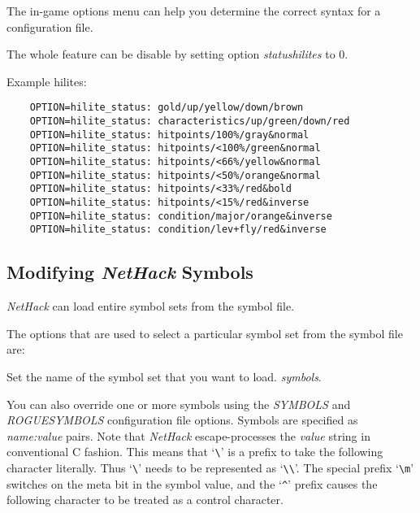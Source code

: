 The in-game options menu can help you determine the correct syntax for a
configuration file.

The whole feature can be disable by setting option {\it statushilites} to 0.

Example hilites:
\begin{verbatim}
    OPTION=hilite_status: gold/up/yellow/down/brown
    OPTION=hilite_status: characteristics/up/green/down/red
    OPTION=hilite_status: hitpoints/100%/gray&normal
    OPTION=hilite_status: hitpoints/<100%/green&normal
    OPTION=hilite_status: hitpoints/<66%/yellow&normal
    OPTION=hilite_status: hitpoints/<50%/orange&normal
    OPTION=hilite_status: hitpoints/<33%/red&bold
    OPTION=hilite_status: hitpoints/<15%/red&inverse
    OPTION=hilite_status: condition/major/orange&inverse
    OPTION=hilite_status: condition/lev+fly/red&inverse
\end{verbatim}

\subsection*{Modifying {\it NetHack\/} Symbols}

{\it NetHack\/} can load entire symbol sets from the symbol file.

The options that are used to select a particular symbol set from the
symbol file are:

\blist{}
\item[\ib{symset}]
Set the name of the symbol set that you want to load.
{\it symbols\/}.
\elist

You can also override one or more symbols using the {\it SYMBOLS\/} and
{\it ROGUESYMBOLS\/} configuration file options.
Symbols are specified as {\it name:value\/} pairs.
Note that {\it NetHack\/} escape-processes
the {\it value\/} string in conventional C fashion.
This means that `\verb+\+' is a prefix to take the following character
literally.
Thus `\verb+\+' needs to be represented as `\verb+\\+'.
The special prefix
`\verb+\m+' switches on the meta bit in the symbol value, and the
`{\tt \^{}}' prefix causes the following character to be treated as a control
character.

